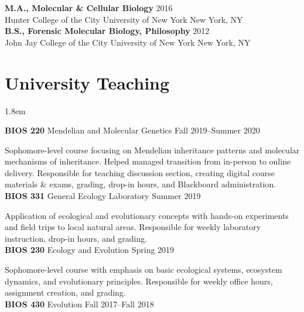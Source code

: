\documentclass[]{article}
\begin{document}
\textbf{M.A., Molecular \& Cellular Biology} \hfill 2016\\ 
Hunter College of the City University of New York \hfill New York, NY\\
     

\textbf{B.S., Forensic Molecular Biology, Philosophy} \hfill 2012\\ 
John Jay College of the City University of New York \hfill New York, NY

\vspace{2mm}
\section{University Teaching}

\vspace{2mm}
\leftskip 1.8em

\textbf{BIOS 220} Mendelian and Molecular Genetics \hfill Fall 2019--Summer 2020
     
Sophomore-level course focusing on Mendelian inheritance patterns and molecular mechanisms of \linebreak inheritance. Helped managed transition from in-person to online delivery. Responsible for teaching discussion section, creating digital course materials \& exams, grading, drop-in hours, and Blackboard \linebreak administration. \href{https://ledelaney.org/teaching/genetics220/}{\faLink} \href{https://github.com/ledelaney/Genetics220}{\faGithub}\\
     
\textbf{BIOS 331} General Ecology Laboratory \hfill Summer 2019

Application of ecological and evolutionary concepts with hands-on experiments and field trips to local natural areas. Responsible for weekly laboratory instruction, drop-in hours, and grading. \href{https://github.com/ledelaney/GeneralEcologyMaterials}{\faGithub}\\
     
\textbf{BIOS 230} Ecology and Evolution \hfill Spring 2019

Sophomore-level course with emphasis on basic ecological systems, ecosystem dynamics, and \linebreak evolutionary principles. Responsible for weekly office hours, assignment creation, and grading.\\
     
\textbf{BIOS 430} Evolution \hfill Fall 2017--Fall 2018
     
\end{document}
